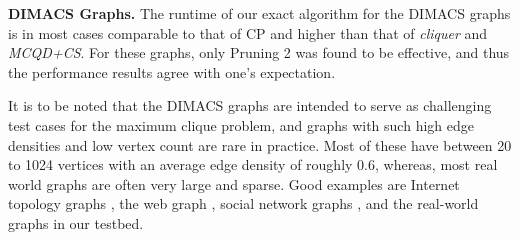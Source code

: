 {\bf DIMACS Graphs. }
The runtime of our exact algorithm for the DIMACS graphs is 
in most cases comparable to that of CP and higher than that of {\it cliquer}
and {\it MCQD+CS}.
For these graphs, only Pruning 2 was found to be effective, 
and thus the performance results agree with one's expectation. 

It is to be noted that the DIMACS graphs are intended to serve as challenging test cases for the maximum clique problem, and graphs with such high edge densities and low vertex count are rare in practice. 
Most of these have between 20 to 1024 vertices with an average edge density of roughly 0.6, 
whereas, most real world graphs are often very large and sparse. Good examples are Internet topology graphs \cite{Faloutsos:1999:PRI:316188.316229}, the web graph \cite{kumar:extracting}, social network graphs \cite{Domingos:2001:MNV:502512.502525}, and the real-world graphs in our testbed. 

